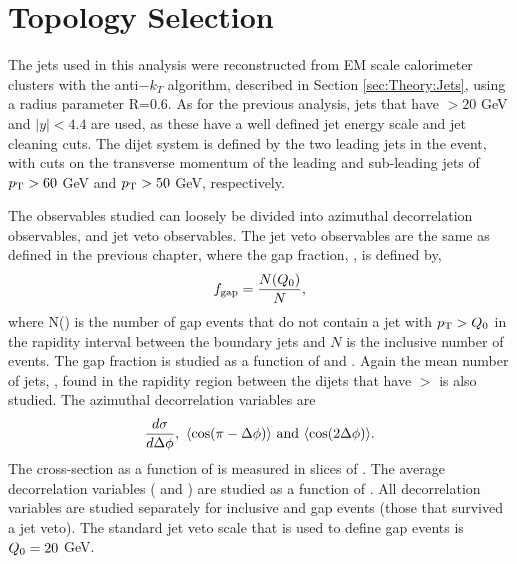 \section{Topology Selection}
\label{sec:GBJ2:AnalSel}
The jets used in this analysis were reconstructed from EM scale calorimeter clusters with the anti$-k_T$ algorithm, described in Section \ref{sec:Theory:Jets}, using a radius parameter R=0.6.
As for the previous analysis, jets that have \pt{}$>20$ GeV and $|y|<4.4$ are used, as these have a well defined jet energy scale and jet cleaning cuts.
The dijet system is defined by the two leading jets in the event, with cuts on the transverse momentum of the leading and sub-leading jets of $\mbox{$p_{\rm T}$}{}>60$ GeV and $\mbox{$p_{\rm T}$}{}>50$ GeV, respectively.



The observables studied can loosely be divided into azimuthal decorrelation observables, and jet veto observables.
The jet veto observables are the same as defined in the previous chapter, where the gap fraction, \gap{}, is defined by,
\begin{equation}
f_{\rm gap} = \frac{N (\mbox{$Q_0$}{})}{N},
\label{GBJ2:fgap}
\end{equation}
where N(\qz{}) is the number of gap events that do not contain a jet with $\mbox{$p_{\rm T}$}{}>\mbox{$Q_0$}{}$ in the rapidity interval between the boundary jets and $N$ is the inclusive number of events.
The gap fraction is studied as a function of \dy{} and \qz{}.
Again the mean number of jets, \nb{}, found in the rapidity region between the dijets that have \pt{}$>$\qz{} is also studied. 
The azimuthal decorrelation variables are
\begin{equation}
\frac{d\sigma}{d\Delta\phi},~\mbox{$\langle \mbox{$\rm cos(\pi - \mbox{$\Delta{\rm \phi}$}{})$} \rangle$}~\rm{and}~\mbox{$\langle \mbox{$\rm cos(2\mbox{$\Delta{\rm \phi}$}{}) $} \rangle$}.
\label{GBJ2:AZVar}
\end{equation}
The cross-section as a function of \dphi{} is measured in slices of \dy{}.
The average decorrelation variables (\mean{\cosdphi} and \mean{\costwodphi})  are studied as a function of \dy{}.
All decorrelation variables are studied separately for inclusive and gap events (those that survived a jet veto).
The standard jet veto scale that is used to define gap events is $\mbox{$Q_0$}{}=20$ GeV.


